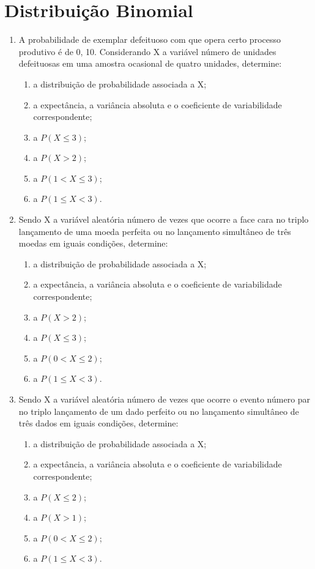 \chapter{Distribuição Binomial}

\begin{enumerate}[resume]

\item A probabilidade de exemplar defeituoso com que opera certo processo produtivo é de 0, 10. Considerando X a variável número de unidades defeituosas em uma amostra ocasional de quatro unidades, determine:
	\begin{enumerate}
	\item a distribuição de probabilidade associada a X;
	\item	a expectância, a variância absoluta e o coeficiente de variabilidade correspondente;
	\item a $P (X \leq 3)$;
	\item a $P(X > 2)$; 
	\item a $P(1 < X \leq 3)$;
	\item	a $P(1 \leq X < 3)$.	
	\end{enumerate}

\item Sendo X a variável aleatória número de vezes que ocorre a face cara no triplo lançamento de uma moeda perfeita ou no lançamento simultâneo de três moedas em iguais condições, determine:
	\begin{enumerate}
	\item a distribuição de probabilidade associada a X;
	\item	a expectância, a variância absoluta e o coeficiente de variabilidade correspondente;
	\item a $P (X > 2)$;
	\item a $P(X \leq  3)$; 
	\item a $P(0 < X \leq 2)$;
	\item	a $P(1 \leq X < 3)$.	
	\end{enumerate}

\item Sendo X a variável aleatória número de vezes que ocorre o evento número par no triplo lançamento de um dado perfeito ou no lançamento simultâneo de três dados em iguais condições, determine:
	\begin{enumerate}
	\item a distribuição de probabilidade associada a X;
	\item	a expectância, a variância absoluta e o coeficiente de variabilidade correspondente;
	\item a $P (X \leq 2)$;
	\item a $P(X > 1)$; 
	\item a $P(0 < X \leq 2)$;
	\item	a $P(1 \leq X < 3)$.	
	\end{enumerate}
	

\end{enumerate}

